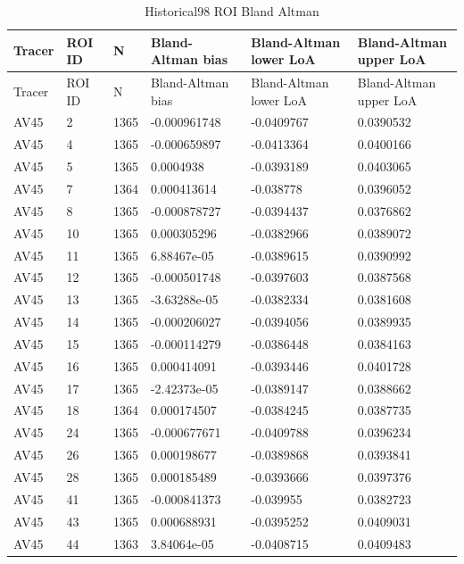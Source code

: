 \begingroup
\footnotesize
\setlength{\tabcolsep}{4pt}
\begin{longtable}{llllll}
\caption{Historical98 ROI Bland Altman}\label{tab:s-n08}\\
\toprule
Tracer & ROI ID & N & Bland-Altman bias & Bland-Altman lower LoA & Bland-Altman upper LoA \\
\midrule
\endfirsthead
\toprule
Tracer & ROI ID & N & Bland-Altman bias & Bland-Altman lower LoA & Bland-Altman upper LoA \\
\midrule
\endhead
\bottomrule
\endfoot
AV45 & 2 & 1365 & -0.000961748 & -0.0409767 & 0.0390532 \\
AV45 & 4 & 1365 & -0.000659897 & -0.0413364 & 0.0400166 \\
AV45 & 5 & 1365 & 0.0004938 & -0.0393189 & 0.0403065 \\
AV45 & 7 & 1364 & 0.000413614 & -0.038778 & 0.0396052 \\
AV45 & 8 & 1365 & -0.000878727 & -0.0394437 & 0.0376862 \\
AV45 & 10 & 1365 & 0.000305296 & -0.0382966 & 0.0389072 \\
AV45 & 11 & 1365 & 6.88467e-05 & -0.0389615 & 0.0390992 \\
AV45 & 12 & 1365 & -0.000501748 & -0.0397603 & 0.0387568 \\
AV45 & 13 & 1365 & -3.63288e-05 & -0.0382334 & 0.0381608 \\
AV45 & 14 & 1365 & -0.000206027 & -0.0394056 & 0.0389935 \\
AV45 & 15 & 1365 & -0.000114279 & -0.0386448 & 0.0384163 \\
AV45 & 16 & 1365 & 0.000414091 & -0.0393446 & 0.0401728 \\
AV45 & 17 & 1365 & -2.42373e-05 & -0.0389147 & 0.0388662 \\
AV45 & 18 & 1364 & 0.000174507 & -0.0384245 & 0.0387735 \\
AV45 & 24 & 1365 & -0.000677671 & -0.0409788 & 0.0396234 \\
AV45 & 26 & 1365 & 0.000198677 & -0.0389868 & 0.0393841 \\
AV45 & 28 & 1365 & 0.000185489 & -0.0393666 & 0.0397376 \\
AV45 & 41 & 1365 & -0.000841373 & -0.039955 & 0.0382723 \\
AV45 & 43 & 1365 & 0.000688931 & -0.0395252 & 0.0409031 \\
AV45 & 44 & 1363 & 3.84064e-05 & -0.0408715 & 0.0409483 \\

\end{longtable}
